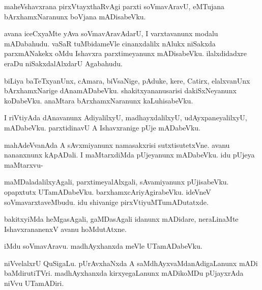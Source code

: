 \documentclass{article}
\begin{document}
\begin{mn}
maheVshavxrana  pirxVtayxthaRvAgi  parxti  soVmavAravU,  eMTujana  bArxhamxNaranunx  boVjana mADisabeVku.
\end{mn}

\begin{mn}
avana  iceCxyaMte  yAva  soVmavAravAdarU,  I  varxtavanunx  modalu  mADabahudu.  vaSaR  tuMbidameVle  
cinanxdalilx  nAlukx  niSakxda  parxmANakekx  oMdu  Ishavxra  parxtimeyanunx  mADisabeVku.  
ilalxdidadxre  eraDu  niSakxdalAlxdarU  Agabahudu.
\end{mn}

\begin{mn}
biLiya  baTeTxyanUnx,  cAmara,  biVsaNige,  pAduke,  kere,  Catirx,  elalxvanUnx  bArxhamxNarige  
dAnamADabeVku.  shakitxyananusarisi  dakiSxNeyanunx  koDabeVku.  anaMtara  bArxhamxNaranunx  kaLuhisabeVku.
\end{mn}

\begin{mn}
I  riVtiyAda  dAnavanunx  AdiyalilxyU,  madhayxdalilxyU,  udAyxpaneyalilxyU,  mADabeVku.  parxtidinavU  
A  Ishavxranige  pUje  mADabeVku.
\end{mn}

\begin{mn}
mahAdeVvanAda  A  sAvxmiyanunx  namasakxrisi  sutxtisutetxVne.  avanu  nananxnunx  kApADali.  I  maMtarxdiMda  
pUjeyanunx  mADabeVku.  idu  pUjeya  maMtarxvu-
\end{mn}

\begin{mn}
maMDaladalilxyAgali,  parxtimeyalAlxgali,  sAvamiyanunx  pUjisabeVku.  opapxtutx  UTamADabeVku.  
barxhamxcAriyAgirabeVku.  ideVneV  soVmavarxtaveMbudu.  idu  shivanige  pirxVtiyuMTumADutatxde.
\end{mn}

\begin{mn}
bakitxyiMda  heMgasAgali,  gaMDasAgali  idanunx  mADidare,  neraLinaMte  IshavxrananenxV  avanu  hoMdutAtxne.
\end{mn}

\begin{mn}
iMdu  soVmavAravu.  madhAyxhanxda  meVle  UTamADabeVku.
\end{mn}

\begin{mn}
niVvelalxrU  QuSigaLu.  pUrAvxhaNxda  A  saMdhAyxvaMdanAdigaLanunx  mADi  baMdirutiTVri.  madhAyxhanxda  
kirxyegaLanunx  mADikoMDu  pUjayxrAda  niVvu  UTamADiri.
\end{mn}
\end{document}
